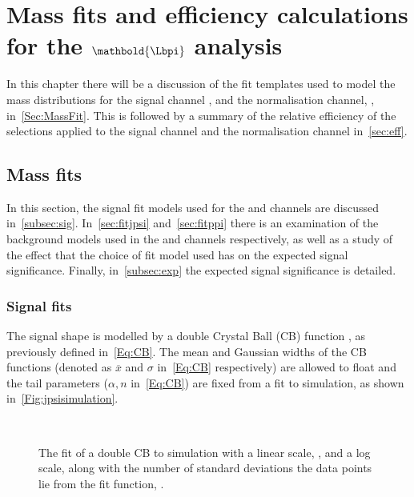 \chapter{Mass fits and efficiency calculations for the $\mathbold{\Lbpi}$ analysis}
In this chapter there will be a discussion of the fit templates used to model the mass distributions for the signal channel \Lbpi, and the normalisation channel, \Lbpijpsi, in~\autoref{Sec:MassFit}. This is followed by a summary of the relative efficiency of the selections applied to the signal channel and the normalisation channel in~\autoref{sec:eff}.
\label{chap:mass}
\section{Mass fits}
\label{Sec:MassFit}
In this section, the signal fit models used for the \Lbpi and \Lbpijpsi channels are discussed in~\autoref{subsec:sig}. In~\autoref{sec:fitjpsi} and~\autoref{sec:fitppi} there is an examination of the background models used in the \Lbpijpsi and \Lbpi channels respectively, as well as a study of the effect that the choice of fit model used has on the expected signal significance. Finally, in~\autoref{subsec:exp} the expected signal significance is detailed.
\subsection{Signal fits}
\label{subsec:sig}
The \Lbpijpsi signal shape is modelled by a double Crystal Ball (\Gls{CB}) function \cite{Skwarnicki:1986xj}, as previously defined in~\autoref{Eq:CB}. The mean and Gaussian widths of the CB functions (denoted as $\overline{x}$ and $\sigma$ in~\autoref{Eq:CB} respectively) are allowed to float and the tail parameters ($\alpha, n$ in~\autoref{Eq:CB}) are fixed from  a fit to \Lbpijpsi simulation, as shown in~\autoref{Fig:jpsisimulation}. %
\begin{figure}[!ht]\def\nh{0.3\textwidth}
  \centering
  \\
    \caption{The fit of a double CB to \Lbpijpsi simulation with a linear scale, \protect{}, and a log scale, along with the number of standard deviations the data points lie from the fit function, \protect{}.}
    \label{Fig:jpsisimulation}
\end{figure}



